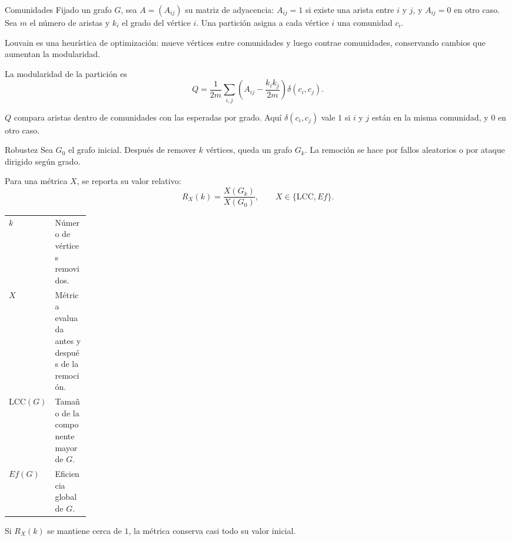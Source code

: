 \documentclass[aspectratio=169,10pt]{beamer}
\newcommand{\thinrule}{\par\vspace{0.2cm}\noindent{\color{linegray}\rule{0.88\linewidth}{0.45pt}}\par\vspace{0.2cm}}
\begin{document}
\begin{frame}{Comunidades}
  \small
  Fijado un grafo \(G\), sea \(A=(A_{ij})\) su matriz de adyacencia: \(A_{ij}=1\) si existe una arista entre \(i\) y \(j\), y \(A_{ij}=0\) en otro caso. Sea \(m\) el número de aristas y \(k_i\) el grado del vértice \(i\). Una partición asigna a cada vértice \(i\) una comunidad \(c_i\).

  \thinrule
  Louvain es una heurística de optimización: mueve vértices entre comunidades y luego contrae comunidades, conservando cambios que aumentan la modularidad.

  \vspace{0.08cm}
  La modularidad de la partición es
  \[
    Q=\frac{1}{2m}\sum_{i,j}
    \left(A_{ij}-\frac{k_i k_j}{2m}\right)
    \delta(c_i,c_j).
  \]

  \thinrule
  \(Q\) compara aristas dentro de comunidades con las esperadas por grado. Aquí \(\delta(c_i,c_j)\) vale \(1\) si \(i\) y \(j\) están en la misma comunidad, y \(0\) en otro caso.

\end{frame}

\begin{frame}{Robustez}
  \small
  Sea \(G_0\) el grafo inicial. Después de remover \(k\) vértices, queda un grafo \(G_k\). La remoción se hace por fallos aleatorios o por ataque dirigido según grado.

  \vspace{0.18cm}
  Para una métrica \(X\), se reporta su valor relativo:
  \[
    R_X(k)=\frac{X(G_k)}{X(G_0)},
    \qquad X\in\{\mathrm{LCC},Ef\}.
  \]

  \begin{tabularx}{\linewidth}{@{}>{\bfseries}p{0.16\linewidth}X@{}}
    \(k\) & Número de vértices removidos. \\
    \(X\) & Métrica evaluada antes y después de la remoción. \\
    \(\mathrm{LCC}(G)\) & Tamaño de la componente mayor de \(G\). \\
    \(Ef(G)\) & Eficiencia global de \(G\). \\
  \end{tabularx}

  \thinrule
  Si \(R_X(k)\) se mantiene cerca de \(1\), la métrica conserva casi todo su valor inicial.
\end{frame}
\end{document}
